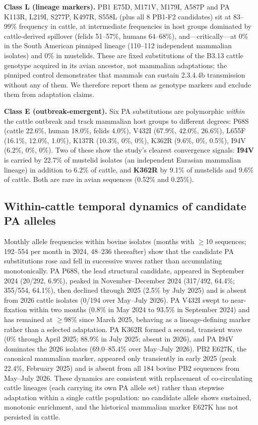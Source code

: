 \documentclass[11pt]{article}
\begin{document}
\textbf{Class L (lineage markers).} PB1 E75D, M171V, M179I, A587P and PA K113R, L219I, S277P, K497R, S558L (plus all 8 PB1-F2 candidates) sit at 83--99\% frequency in cattle, at intermediate frequencies in host groups dominated by cattle-derived spillover (felids 51--57\%, humans 64--68\%), and---critically---at 0\% in the South American pinniped lineage (110--112 independent mammalian isolates) and 0\% in mustelids. These are fixed substitutions of the B3.13 cattle genotype acquired in its avian ancestor, not mammalian adaptations; the pinniped control demonstrates that mammals can sustain 2.3.4.4b transmission without any of them. We therefore report them as genotype markers and exclude them from adaptation claims.

\textbf{Class E (outbreak-emergent).} Six PA substitutions are polymorphic \emph{within} the cattle outbreak and track mammalian host groups to different degrees: P68S (cattle 22.6\%, human 18.0\%, felids 4.0\%), V432I (67.9\%, 42.0\%, 26.6\%), L655F (16.1\%, 12.0\%, 1.0\%), K137R (10.3\%, 0\%, 0\%), K362R (9.6\%, 0\%, 0.5\%), I94V (6.2\%, 0\%, 0\%). Two of these show the study's clearest convergence signals: \textbf{I94V} is carried by 22.7\% of mustelid isolates (an independent Eurasian mammalian lineage) in addition to 6.2\% of cattle, and \textbf{K362R} by 9.1\% of mustelids and 9.6\% of cattle. Both are rare in avian sequences (0.52\% and 0.25\%).

\subsection{Within-cattle temporal dynamics of candidate PA alleles}
Monthly allele frequencies within bovine isolates (months with $\geq$10 sequences; 192--554 per month in 2024, 48--236 thereafter) show that the candidate PA substitutions rose and fell in successive waves rather than accumulating monotonically. PA P68S, the lead structural candidate, appeared in September 2024 (20/292, 6.9\%), peaked in November--December 2024 (317/492, 64.4\%; 355/554, 64.1\%), then declined through 2025 (2.5\% by July 2025) and is absent from 2026 cattle isolates (0/194 over May--July 2026). PA V432I swept to near-fixation within two months (0.8\% in May 2024 to 93.5\% in September 2024) and has remained at $\geq$98\% since March 2025, behaving as a lineage-defining marker rather than a selected adaptation. PA K362R formed a second, transient wave (0\% through April 2025; 88.9\% in July 2025; absent in 2026), and PA I94V dominates the 2026 isolates (69.0--85.4\% over May--July 2026). PB2 E627K, the canonical mammalian marker, appeared only transiently in early 2025 (peak 22.4\%, February 2025) and is absent from all 184 bovine PB2 sequences from May--July 2026. These dynamics are consistent with replacement of co-circulating cattle lineages (each carrying its own PA allele set) rather than stepwise adaptation within a single cattle population: no candidate allele shows sustained, monotonic enrichment, and the historical mammalian marker E627K has not persisted in cattle.
\end{document}
